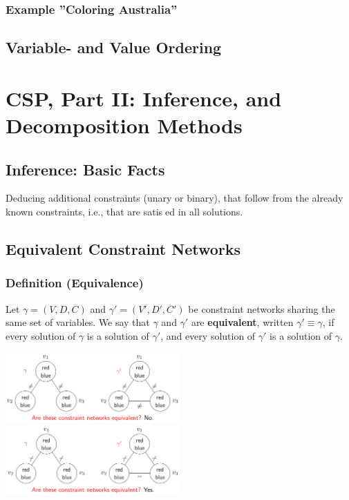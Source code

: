 \documentclass[conference, a4paper]{styles/acmsiggraph}
\begin{document}
        \subsubsection{Example ''Coloring Australia''}
    \subsection{Variable- and Value Ordering}
    
    
    
    
    
    
    
    
    
    
\section{CSP, Part II: Inference, and Decomposition Methods}
    
    \subsection{Inference: Basic Facts}
        Deducing additional constraints (unary or binary), that follow from the already known constraints, i.e., that are satised in all solutions.
    
    \subsection{Equivalent Constraint Networks}
        \subsubsection{Definition (Equivalence)}
            Let $\gamma = (V,D,C)$ and $\gamma' = (V',D',C')$ be constraint networks sharing the same set of variables.
            We say that $\gamma$ and $\gamma'$ are \textbf{equivalent}, written $\gamma' \equiv \gamma$, if every solution of $\gamma$ is a solution of $\gamma'$, and every solution of $\gamma'$ is a solution of $\gamma$.\newline
            
            \includegraphics[width=0.5\textwidth]{imgs/ECN_NO.png}\ \ \ \ \ \ 
            \includegraphics[width=0.5\textwidth]{imgs/ECN_YES.png}\newline
            
\end{document}
